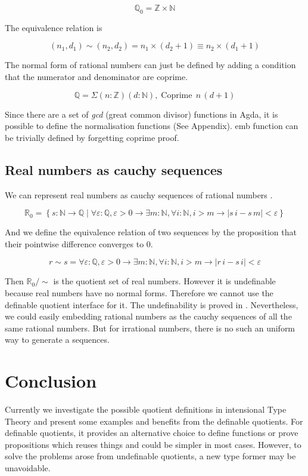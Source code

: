 \documentclass[envcountsame]{llncs}
\newcommand{\N}{\mathbb{N}}
\newcommand{\Q}{\mathbb{Q}}
\newcommand{\R}{\mathbb{R}}
\newcommand{\Z}{\mathbb{Z}}
\providecommand{\set}  [1]{\left\{#1\right\}}
\DeclareMathOperator{\coprime}{Coprime}
\newcommand{\itt}{intensional Type Theory}
\begin{document}
$$\Q_0 = \Z \times \N$$



The equivalence relation is

$$(n_1, d_1) \sim (n_2, d_2) = n_1 \times (d_2 + 1) \equiv n_2 \times (d_1 + 1) $$

The normal form of rational numbers can just be defined by adding a condition that the numerator and denominator are coprime.

$$\Q = \Sigma (n \colon \Z)(d \colon \N), \coprime \,n \,(d +1)$$

Since there are a set of \emph{gcd} (great common divisor) functions in Agda, it is possible to define the normalisation functions (See Appendix).
emb function can be trivially defined by forgetting coprime proof.

\subsection{Real numbers as cauchy sequences}

We can represent real numbers as cauchy sequences of rational numbers \cite{bis:85}.

$$\R_{0} = \set{s : \N\to\Q \mid \forall\varepsilon :\Q,\varepsilon>0\to\exists m:\N, \forall i:\N, i>m\to |s\,i - s\, m|<\varepsilon}$$

And we define the equivalence relation of two sequences by the proposition that their pointwise difference converges to 0.

$$r \sim s = \forall\varepsilon :\Q,\varepsilon>0\to\exists m:\N, \forall i:\N, i>m\to |r\,i - s\,i|<\varepsilon$$

Then $\R_0 /\sim$ is the quotient set of real numbers. However it is undefinable because real numbers have no normal forms.
Therefore we cannot use the definable quotient interface for it. The undefinability is proved in \cite{aan}.
Nevertheless, we could easily embedding rational numbers as the cauchy sequences of all the same rational numbers. But for irrational numbers, there is no such an uniform way to generate a sequences.
\section{Conclusion}

Currently we investigate the possible quotient definitions in \itt{} and present some examples and benefits from the definable quotients. For definable quotients, it provides an alternative choice to define functions or prove propositions which reuses things and could be simpler in most cases. However, to solve the problems arose from undefinable quotients, a new type former may be unavoidable.
\end{document}

